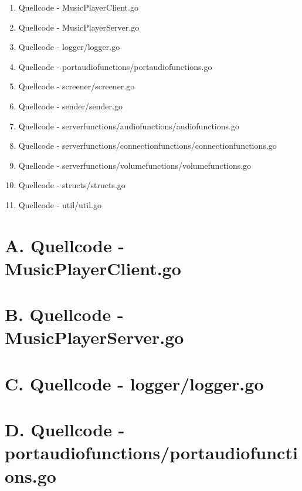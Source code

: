 
\addchap{\langanhang}

{\large
\begin{enumerate}[label=\Alph*.]
	\item Quellcode - MusicPlayerClient.go
	\item Quellcode - MusicPlayerServer.go
	\item Quellcode - logger/logger.go
	\item Quellcode - portaudiofunctions/portaudiofunctions.go
	\item Quellcode - screener/screener.go
	\item Quellcode - sender/sender.go
	\item Quellcode - serverfunctions/audiofunctions/audiofunctions.go
	\item Quellcode - serverfunctions/connectionfunctions/connectionfunctions.go
	\item Quellcode - serverfunctions/volumefunctions/volumefunctions.go
	\item Quellcode - structs/structs.go
	\item Quellcode - util/util.go
\end{enumerate}
}
\pagebreak

\section*{A. Quellcode - MusicPlayerClient.go}


\pagebreak

\section*{B. Quellcode - MusicPlayerServer.go}


\pagebreak

\section*{C. Quellcode - logger/logger.go}


\pagebreak

\section*{D. Quellcode - portaudiofunctions/portaudiofunctions.go}


